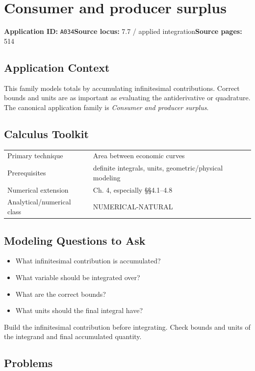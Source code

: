 \documentclass[11pt]{book}
\newcommand{\pid}[1]{\texttt{#1}}
\begin{document}
\chapter{Consumer and producer surplus}\label{app:A034}
\textbf{Application ID:} \pid{A034}\quad \textbf{Source locus:} 7.7 / applied integration\quad \textbf{Source pages:} 514
\section*{Application Context}
This family models totals by accumulating infinitesimal contributions. Correct bounds and units are as important as evaluating the antiderivative or quadrature. The canonical application family is \emph{Consumer and producer surplus}.
\section*{Calculus Toolkit}
\begin{tabularx}{\textwidth}{@{}lX@{}}\toprule
Primary technique & Area between economic curves \\
Prerequisites & definite integrals, units, geometric/physical modeling \\
Numerical extension & Ch. 4, especially §§4.1–4.8 \\
Analytical/numerical class & NUMERICAL-NATURAL \\
\bottomrule\end{tabularx}
\section*{Modeling Questions to Ask}\begin{itemize}
\item What infinitesimal contribution is accumulated?
\item What variable should be integrated over?
\item What are the correct bounds?
\item What units should the final integral have?
\end{itemize}
\begin{errorbox}Build the infinitesimal contribution before integrating. Check bounds and units of the integrand and final accumulated quantity.\end{errorbox}
\section*{Problems}
\end{document}
